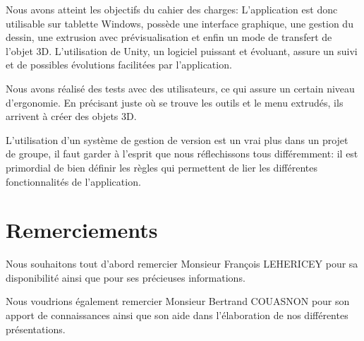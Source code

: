 \documentclass[a4paper,11pt]{article}
\begin{document}
		Nous avons atteint les objectifs du cahier des charges:
		L'application est donc utilisable sur tablette Windows, possède une interface graphique, une gestion du dessin, une extrusion avec prévisualisation et enfin un mode de transfert de l'objet 3D. L'utilisation de Unity, un logiciel puissant et évoluant, assure un suivi et de possibles évolutions facilitées par l'application.
		
		Nous avons réalisé des tests avec des utilisateurs, ce qui assure un certain niveau d'ergonomie. En précisant juste où se trouve les outils et le menu extrudés, ils arrivent à créer des objets 3D.
		
		L'utilisation d'un système de gestion de version est un vrai plus dans un projet de groupe, il faut garder à l'esprit que nous réflechissons tous différemment: il est primordial de bien définir les règles qui permettent de lier les différentes fonctionnalités de l'application.
		

	
	\section{Remerciements}
		Nous souhaitons tout d'abord remercier Monsieur François LEHERICEY pour sa disponibilité ainsi que pour ses précieuses informations.
		
		Nous voudrions également remercier Monsieur Bertrand COUASNON pour son apport de connaissances ainsi que son aide dans l'élaboration de nos différentes présentations.
	
\end{document}
